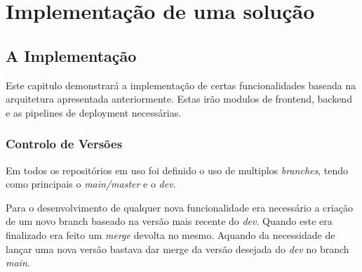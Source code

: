 \chapter{Implementação de uma solução}

\section{A Implementação}

Este capitulo demonstrará a implementação de certas funcionalidades baseada na arquitetura apresentada anteriormente. Estas irão modulos de frontend, backend e as pipelines de deployment necessárias. 





\subsection{Controlo de Versões}

Em todos os repositórios em uso foi definido o uso de multiplos \textit{branches}, tendo como principais o \textit{main/master} e o \textit{dev}. 

Para o desenvolvimento de qualquer nova funcionalidade era necessário a criação de um novo branch baseado na versão mais recente do \textit{dev}. Quando este era finalizado era feito um \textit{merge} devolta no mesmo. Aquando da necessidade de lançar uma nova versão bastava dar merge da versão desejada do \textit{dev} no branch \textit{main}.







